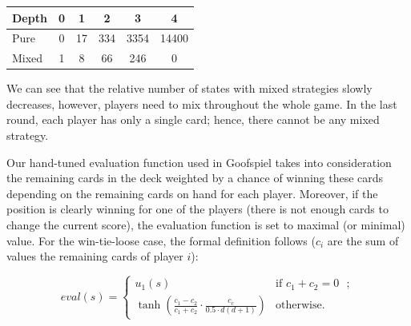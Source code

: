 \vspace{0.1cm}

\begin{center}
\small
\begin{tabular}{|l|c|c|c|c|c|}
\hline Depth & 0 & 1 & 2 & 3 & 4 \\
\hline Pure  & 0 & 17 & 334 & 3354 & 14400 \\
\hline Mixed & 1 &  8 &  66 &  246 & 0 \\
\hline
\end{tabular}
\end{center}

\vspace{0.1cm}

We can see that the relative number of states with mixed strategies slowly decreases, however, players need to mix throughout the whole game.
In the last round, each player has only a single card; hence, there cannot be any mixed strategy.


Our hand-tuned evaluation function used in Goofspiel takes into consideration the remaining cards in the deck weighted by a chance of winning these cards depending on the remaining cards on hand for each player.
Moreover, if the position is clearly winning for one of the players (there is not enough cards to change the current score), the evaluation function is set to maximal (or minimal) value.
For the win-tie-loose case, the formal definition follows ($c_i$ are the sum of values the remaining cards of player $i$):

\[
eval(s) = \left\{ \begin{array}{ll}
  u_1(s) & \mbox{if $c_1 + c_2 = 0$ };\\
  \tanh\left(\frac{c_1 - c_2}{c_1 + c_2}\cdot\frac{c_c}{0.5 \cdot d(d+1)}\right) & \mbox{otherwise.} \end{array} \right.
\]


